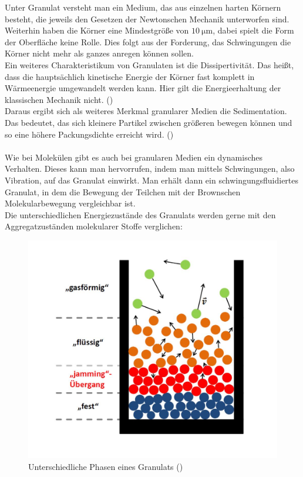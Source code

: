 Unter Granulat versteht man ein Medium, das aus einzelnen harten Körnern besteht, die jeweils den Gesetzen der Newtonschen Mechanik unterworfen sind. Weiterhin haben die Körner eine Mindestgröße von $\SI{10}{\micro\meter}$, dabei spielt die Form der Oberfläche keine Rolle. Dies folgt aus der Forderung, das Schwingungen die Körner nicht mehr als ganzes anregen können sollen. \\
Ein weiteres Charakteristikum von Granulaten ist die Dissipertivität. Das heißt, dass die hauptsächlich kinetische Energie der Körner fast komplett in Wärmeenergie umgewandelt werden kann. Hier gilt die Energieerhaltung der klassischen Mechanik nicht. (\cite{DLRWebsite}) \\
Daraus ergibt sich als weiteres Merkmal granularer Medien die Sedimentation. Das bedeutet, das sich kleinere Partikel zwischen größeren bewegen können und so eine höhere Packungsdichte erreicht wird. (\cite{PhysikimKontext}) \\
\hfill \\ 
Wie bei Molekülen gibt es auch bei granularen Medien ein dynamisches Verhalten. Dieses kann man hervorrufen, indem man mittels Schwingungen, also Vibration, auf das Granulat einwirkt. Man erhält dann ein schwingungsfluidiertes Granulat, in dem die Bewegung der Teilchen mit der Brownschen Molekularbewegung vergleichbar ist. \\
Die unterschiedlichen Energiezustände des Granulats werden gerne mit den Aggregatzuständen molekularer Stoffe verglichen:


\begin{center}
\begin{figure}[h]
	\includegraphics[scale=0.45]{Einleitung_1.jpg}
	\caption{Unterschiedliche Phasen eines Granulats  (\cite{GranularJamming})}
\end{figure}	
\end{center}

